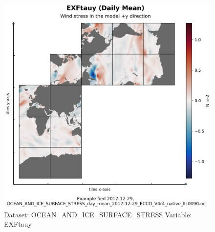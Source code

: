 \begin{figure}[H]
\centering
\includegraphics[width=\textwidth]{../images/plots/native_plots/Ocean_and_Sea-Ice_Surface_Stress/EXFtauy.png}
\caption{Dataset: OCEAN\_AND\_ICE\_SURFACE\_STRESS Variable: EXFtauy}
\label{tab:table-OCEAN_AND_ICE_SURFACE_STRESS_EXFtauy-Plot}
\end{figure}
\pagebreak

